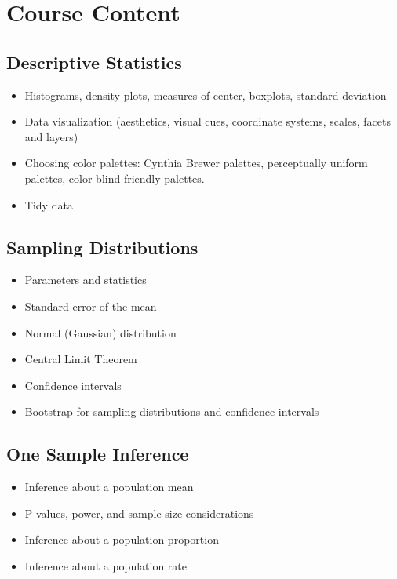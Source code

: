 \documentclass[]{article}
\begin{document}
\section{Course Content}

\subsection{Descriptive Statistics}
\begin{itemize}
\item Histograms, density plots, measures of center, boxplots, standard deviation
\item Data visualization (aesthetics, visual cues, coordinate systems, scales, facets and layers)
\item Choosing color palettes: Cynthia Brewer palettes, perceptually uniform palettes, color blind friendly palettes. 
\item Tidy data
\end{itemize}

\subsection{Sampling Distributions}
\begin{itemize}
\item Parameters and statistics
\item Standard error of the mean
\item Normal (Gaussian) distribution
\item Central Limit Theorem
\item Confidence intervals
\item Bootstrap for sampling distributions and confidence intervals
\end{itemize}

\subsection{One Sample Inference}
\begin{itemize}
\item Inference about a population mean
\item P values, power, and sample size considerations
\item Inference about a population proportion
\item Inference about a population rate
\end{itemize}
\end{document}
